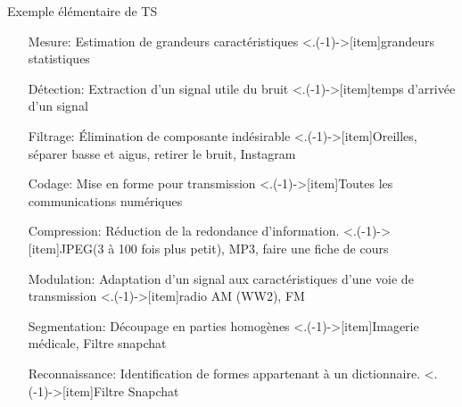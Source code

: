 \documentclass{beamer}
\begin{document}
\begin{frame}{Exemple élémentaire de TS}
  \setlength{\leftmargini}{2.5cm}         %
  \begin{itemize}
    \item[Mesure:\pause] Estimation de grandeurs caractéristiques\pause
    \note<.(-1)->[item]{grandeurs statistiques}
    \item[Détection:\pause] Extraction d'un signal utile du bruit\pause
    \note<.(-1)->[item]{temps d'arrivée d'un signal}
    \item[Filtrage:\pause] Élimination de composante indésirable\pause
    \note<.(-1)->[item]{Oreilles, séparer basse et aigus, retirer le bruit, Instagram}
    \item[Codage:\pause] Mise en forme pour transmission\pause
    \note<.(-1)->[item]{Toutes les communications numériques}
    \item[Compression:\pause] Réduction de la redondance d'information.\pause
    \note<.(-1)->[item]{JPEG(3 à 100 fois plus petit), MP3, faire une fiche de cours}
    \item[Modulation:\pause] Adaptation d'un signal aux caractéristiques d'une voie de transmission\pause
    \note<.(-1)->[item]{radio AM (WW2), FM }
    \item[Segmentation:\pause] Découpage en parties homogènes\pause
    \note<.(-1)->[item]{Imagerie médicale, Filtre snapchat}
    \item[Reconnaissance:\pause] Identification de formes appartenant à un dictionnaire.\pause
    \note<.(-1)->[item]{Filtre Snapchat}
  \end{itemize}
\end{frame}
\end{document}
